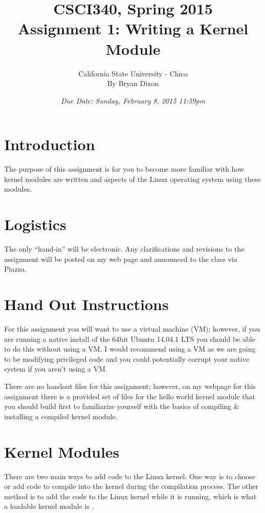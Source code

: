 \documentclass[11pt]{article}
\begin{document}
\title{CSCI340, Spring 2015\\
Assignment 1: Writing a Kernel Module
}

\author{California State University - Chico\\
  By Bryan Dixon\\
}
\date{\emph{Due Date: Sunday, February 8, 2015 11:59pm}}


\maketitle

\section*{Introduction}
The purpose of this assignment is for you to become more familiar with how kernel modules are written and aspects of the Linux operating system using these modules. 

\section*{Logistics}

The only ``hand-in'' will be electronic.  Any clarifications and revisions to the assignment will
be posted on my web page and announced to the class via Piazza.

\section*{Hand Out Instructions}

For this assignment you will want to use a virtual machine (VM); however, if you are running a native install of the 64bit Ubuntu 14.04.1 LTS you should be able to do this without using a VM. I would recommend using a VM as we are going to be modifying privileged code and you could potentially corrupt your native system if you aren't using a VM. 

There are no handout files for this assignment; however, on my webpage for this assignment there is a provided set of files for the hello world kernel module that you should build first to familiarize yourself with the basics of compiling \& installing a compiled kernel module. 


\section*{Kernel Modules}

There are two main ways to add code to the Linux kernel. One way is to choose or add code to compile into the kernel during the compilation process. The other method is to add the code to the Linux kernel while it is running, which is what a loadable kernel module is \cite{tldp}.
\end{document}
